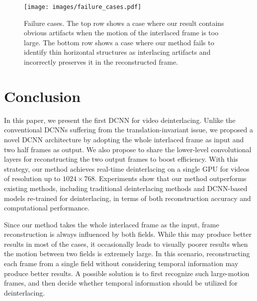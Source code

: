 \documentclass[acmtog]{acmart}
\begin{document}
\fi
\begin{figure}[!tp]
	\centering
	\texttt{[image: images/failure\_cases.pdf]}\\
	\caption{Failure cases. The top row shows a case where our result contains obvious artifacts when the motion of the interlaced frame is too large. The bottom row shows a case where our method fails to identify thin horizontal structures as interlacing artifacts and incorrectly preserves it in the reconstructed frame.}\label{fig:failure_cases}
\end{figure} \section{Conclusion}
In this paper, we present the first DCNN for video deinterlacing. Unlike
the conventional DCNNs suffering from the translation-invariant issue, we
proposed a novel DCNN architecture by adopting the whole interlaced frame as
input and two half frames as output. We also propose to share the lower-level
convolutional layers for reconstructing the two output frames to boost  
efficiency. With this strategy, our method achieves real-time deinterlacing
on a single GPU for videos of resolution up to $1024\times768$.
Experiments show that our method outperforms existing methods,
including traditional deinterlacing methods and DCNN-based models re-trained for
deinterlacing, in terms of both reconstruction accuracy and computational
performance.

Since our method takes the whole interlaced frame as the input, frame
reconstruction is always influenced by both fields. While this may produce
better results in most of the cases, it occasionally leads to visually poorer
results when the
motion between two fields is extremely large. In this scenario, reconstructing
each frame from a single field without considering temporal information may
produce better results. A possible solution is to first recognize such large-motion
frames, and then decide whether temporal information should be utilized for 
deinterlacing.

 


\end{document}
